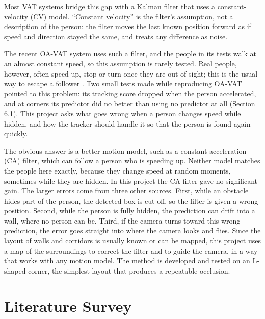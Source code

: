 \documentclass[12pt,a4paper]{article}
\begin{document}
Most VAT systems bridge this gap with a Kalman filter that uses a constant-velocity (CV) model.
``Constant velocity'' is the filter's assumption, not a description of the person: the filter moves the last known position forward as if speed and direction stayed the same, and treats any difference as noise.

The recent OA-VAT system \cite{r3} uses such a filter, and the people in its tests walk at an almost constant speed, so this assumption is rarely tested.
Real people, however, often speed up, stop or turn once they are out of sight; this is the usual way to escape a follower \cite{r4}.
Two small tests made while reproducing OA-VAT pointed to this problem: its tracking score dropped when the person accelerated, and at corners its predictor did no better than using no predictor at all (Section 6.1).
This project asks what goes wrong when a person changes speed while hidden, and how the tracker should handle it so that the person is found again quickly.

The obvious answer is a better motion model, such as a constant-acceleration (CA) filter, which can follow a person who is speeding up.
Neither model matches the people here exactly, because they change speed at random moments, sometimes while they are hidden.
In this project the CA filter gave no significant gain.
The larger errors come from three other sources.
First, while an obstacle hides part of the person, the detected box is cut off, so the filter is given a wrong position.
Second, while the person is fully hidden, the prediction can drift into a wall, where no person can be.
Third, if the camera turns toward this wrong prediction, the error goes straight into where the camera looks and flies.
Since the layout of walls and corridors is usually known or can be mapped, this project uses a map of the surroundings to correct the filter and to guide the camera, in a way that works with any motion model.
The method is developed and tested on an L-shaped corner, the simplest layout that produces a repeatable occlusion.

\section{Literature Survey}
\end{document}
